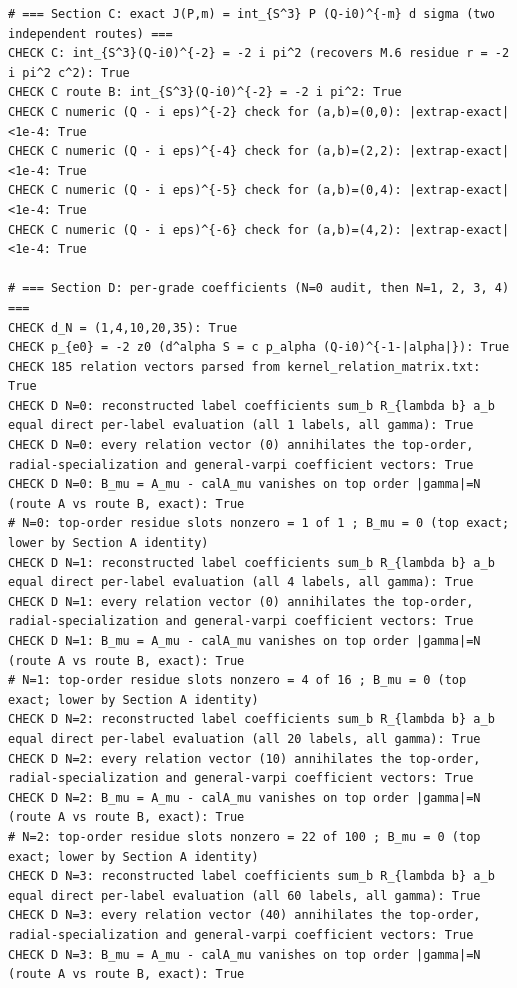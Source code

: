 \documentclass{article}
\theoremstyle{remark}
\begin{document}
\begin{lstlisting}
# === Section C: exact J(P,m) = int_{S^3} P (Q-i0)^{-m} d sigma (two independent routes) ===
CHECK C: int_{S^3}(Q-i0)^{-2} = -2 i pi^2 (recovers M.6 residue r = -2 i pi^2 c^2): True
CHECK C route B: int_{S^3}(Q-i0)^{-2} = -2 i pi^2: True
CHECK C numeric (Q - i eps)^{-2} check for (a,b)=(0,0): |extrap-exact|<1e-4: True
CHECK C numeric (Q - i eps)^{-4} check for (a,b)=(2,2): |extrap-exact|<1e-4: True
CHECK C numeric (Q - i eps)^{-5} check for (a,b)=(0,4): |extrap-exact|<1e-4: True
CHECK C numeric (Q - i eps)^{-6} check for (a,b)=(4,2): |extrap-exact|<1e-4: True

# === Section D: per-grade coefficients (N=0 audit, then N=1, 2, 3, 4) ===
CHECK d_N = (1,4,10,20,35): True
CHECK p_{e0} = -2 z0 (d^alpha S = c p_alpha (Q-i0)^{-1-|alpha|}): True
CHECK 185 relation vectors parsed from kernel_relation_matrix.txt: True
CHECK D N=0: reconstructed label coefficients sum_b R_{lambda b} a_b equal direct per-label evaluation (all 1 labels, all gamma): True
CHECK D N=0: every relation vector (0) annihilates the top-order, radial-specialization and general-varpi coefficient vectors: True
CHECK D N=0: B_mu = A_mu - calA_mu vanishes on top order |gamma|=N (route A vs route B, exact): True
# N=0: top-order residue slots nonzero = 1 of 1 ; B_mu = 0 (top exact; lower by Section A identity)
CHECK D N=1: reconstructed label coefficients sum_b R_{lambda b} a_b equal direct per-label evaluation (all 4 labels, all gamma): True
CHECK D N=1: every relation vector (0) annihilates the top-order, radial-specialization and general-varpi coefficient vectors: True
CHECK D N=1: B_mu = A_mu - calA_mu vanishes on top order |gamma|=N (route A vs route B, exact): True
# N=1: top-order residue slots nonzero = 4 of 16 ; B_mu = 0 (top exact; lower by Section A identity)
CHECK D N=2: reconstructed label coefficients sum_b R_{lambda b} a_b equal direct per-label evaluation (all 20 labels, all gamma): True
CHECK D N=2: every relation vector (10) annihilates the top-order, radial-specialization and general-varpi coefficient vectors: True
CHECK D N=2: B_mu = A_mu - calA_mu vanishes on top order |gamma|=N (route A vs route B, exact): True
# N=2: top-order residue slots nonzero = 22 of 100 ; B_mu = 0 (top exact; lower by Section A identity)
CHECK D N=3: reconstructed label coefficients sum_b R_{lambda b} a_b equal direct per-label evaluation (all 60 labels, all gamma): True
CHECK D N=3: every relation vector (40) annihilates the top-order, radial-specialization and general-varpi coefficient vectors: True
CHECK D N=3: B_mu = A_mu - calA_mu vanishes on top order |gamma|=N (route A vs route B, exact): True

\end{lstlisting}
\end{document}

